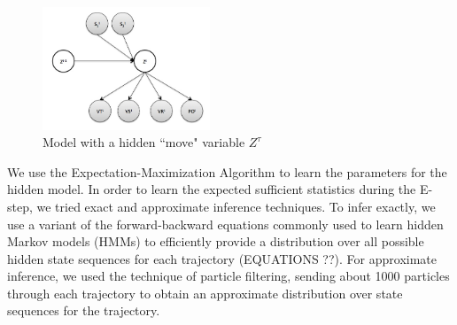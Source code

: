 \documentclass{article} %
\begin{document}
\begin{figure}
  \begin{center}
    \includegraphics[width=5cm]{hidden.jpg}
  \end{center}
  \caption{Model with a hidden ``move" variable $Z^\tau$}
\end{figure}

\normalsize
We use the Expectation-Maximization Algorithm to learn the parameters for the hidden model. In order to learn the expected sufficient statistics during the E-step, we tried exact and approximate inference techniques. To infer exactly, we use a variant of the forward-backward equations commonly used to learn hidden Markov models (HMMs) to efficiently provide a distribution over all possible hidden state sequences for each trajectory (EQUATIONS ??). For approximate inference, we used the technique of particle filtering, sending about 1000 particles through each trajectory to obtain an approximate distribution over state sequences for the trajectory.

\normalsize
\end{document}
